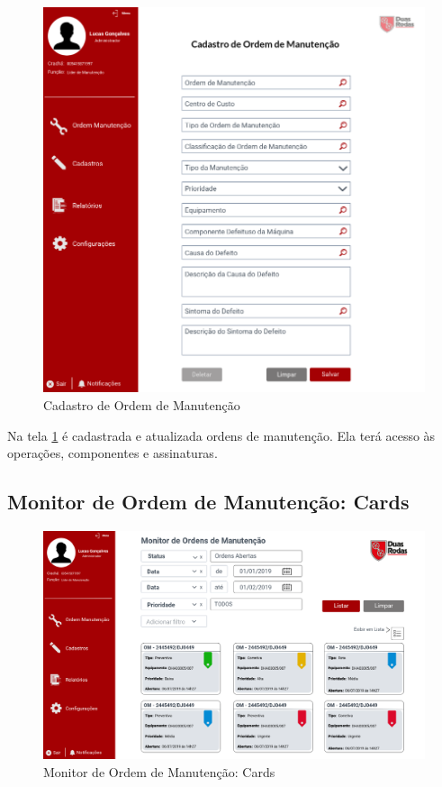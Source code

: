 {	\begin{figure}[htb]
		\caption{\label{web_cad-om}Cadastro de Ordem de Manutenção}
		\begin{center}
			\includegraphics[scale=0.65]{./Figuras/web/cad-om.png}
		\end{center}
	\end{figure}
	
	Na tela \ref{web_cad-om} é cadastrada e atualizada ordens de manutenção. Ela terá acesso às operações, componentes e assinaturas.
	
	
	\subsection{Monitor de Ordem de Manutenção: Cards}
	
	\begin{figure}[htb]
		\caption{\label{web_monitor-om-card}Monitor de Ordem de Manutenção: Cards}
		\begin{center}
			\includegraphics[scale=0.45]{./Figuras/web/monitor-om-card.png}
		\end{center}
	\end{figure}
	
}
